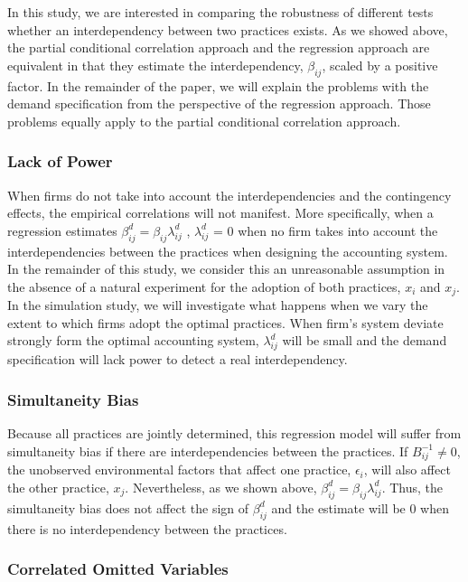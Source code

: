 \documentclass[12pt]{article}
\begin{document}
In this study, we are interested in comparing the robustness of different tests whether an interdependency between two practices exists. As we showed above, the partial conditional correlation approach and the regression approach are equivalent in that they estimate the interdependency, $\beta_{ij}$, scaled by a positive factor. In the remainder of the paper, we will explain the problems with the demand specification from the perspective of the regression approach. Those problems equally apply to the partial conditional correlation approach.  

\subsubsection{Lack of Power}

When firms do not take into account the interdependencies and the contingency effects, the empirical correlations will not manifest. More specifically, when a regression estimates $\beta^d_{ij} = \beta_{ij} \lambda^d_{ij}$ , $\lambda^d_{ij}$ = 0 when no firm takes into account the interdependencies between the practices when designing the accounting system. In the remainder of this study, we consider this an unreasonable  assumption in the absence of a natural experiment for the adoption of both practices, $x_i$ and $x_j$. In the simulation study, we will investigate what happens when we vary the extent to which firms adopt the optimal practices. When firm's system deviate strongly form the optimal accounting system, $\lambda^d_{ij}$ will be small and the demand specification will lack power to detect a real interdependency.

\subsubsection{Simultaneity Bias}

Because all practices are jointly determined, this regression model will suffer from simultaneity bias \citep{Chenhall2007} if there are interdependencies between the practices. If $B^{-1}_{ij} \neq 0$, the unobserved environmental factors that affect one practice, $\epsilon_i$, will also affect the other practice, $x_j$. Nevertheless, as we shown above, $\beta^d_{ij} = \beta_{ij} \lambda^d_{ij}$. Thus, the simultaneity bias does not affect the sign of $\beta^d_{ij}$ and the estimate will be 0 when there is no interdependency between the practices. 

\subsubsection{Correlated Omitted Variables}
\end{document}
